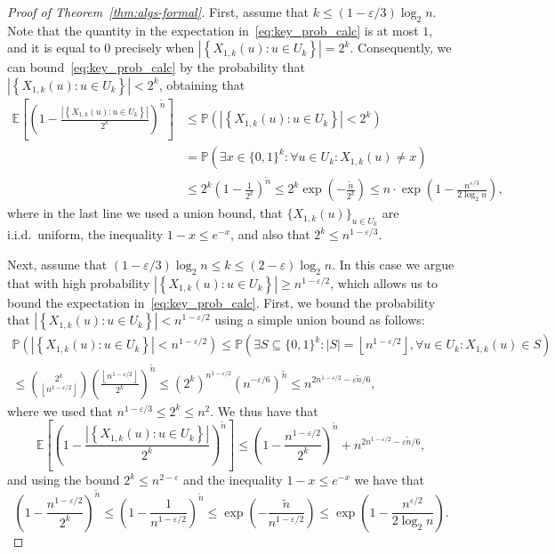 \documentclass[11pt]{article}
\theoremstyle{plain}
\theoremstyle{definition}
\theoremstyle{remark}
\newcommand{\E}{\mathbb{E}}
\newcommand{\eps}{\varepsilon}
\renewcommand{\Pr}{\mathbb{P}}
\begin{document}
\begin{proof}[Proof of Theorem~\ref{thm:algs-formal}]
First, assume that $k \leq (1-\eps/3) \log_{2} n$. 
Note that the quantity in the expectation in~\eqref{eq:key_prob_calc} is at most $1$, and it is equal to $0$ precisely when 
$\left| \left\{ X_{1,k}(u) : u \in U_{k} \right\} \right| = 2^{k}$. 
Consequently, we can bound~\eqref{eq:key_prob_calc} by the probability that 
$\left| \left\{ X_{1,k}(u) : u \in U_{k} \right\} \right| < 2^{k}$, 
obtaining that 
\begin{align*}
\E \left[ \left( 1 - \frac{\left| \left\{ X_{1,k}(u) : u \in U_{k} \right\} \right|}{2^{k}} \right)^{\widetilde{n}} \right]
&\leq 
\Pr \left( \left| \left\{ X_{1,k}(u) : u \in U_{k} \right\} \right| < 2^{k} \right) \\
&= \Pr \left( \exists x \in \{0,1\}^{k} : \forall u \in U_{k} : X_{1,k}(u) \neq x \right) \\
&\leq 2^{k} \left( 1 - \frac{1}{2^{k}} \right)^{\widetilde{n}} 
\leq 2^{k} \exp \left( - \frac{\widetilde{n}}{2^{k}} \right) 
\leq n \cdot \exp \left( 1 - \frac{n^{\eps/3}}{2 \log_2 n} \right),
\end{align*}
where in the last line we used a union bound, 
that $\{ X_{1,k}(u) \}_{u \in U_{k}}$ are i.i.d.\ uniform, 
the inequality $1-x \leq e^{-x}$, 
and also that $2^{k} \leq n^{1-\eps/3}$. 


Next, assume that 
$(1-\eps/3) \log_{2} n \leq k \leq (2-\eps) \log_{2} n$. 
In this case we argue that with high probability 
$\left| \left\{ X_{1,k}(u) : u \in U_{k} \right\} \right| \geq n^{1-\eps/2}$, 
which allows us to bound the expectation in~\eqref{eq:key_prob_calc}. 
First, we bound the probability that 
$\left| \left\{ X_{1,k}(u) : u \in U_{k} \right\} \right| < n^{1-\eps/2}$
using a simple union bound as follows: 
\begin{multline*}
\Pr \left( \left| \left\{ X_{1,k}(u) : u \in U_{k} \right\} \right| < n^{1-\eps/2} \right) 
\leq 
\Pr \left( \exists S \subseteq \{0,1\}^{k} : |S| = \left\lfloor n^{1-\eps/2} \right\rfloor, \forall u \in U_{k} : X_{1,k}(u) \in S \right) \\
\leq \binom{2^{k}}{\left\lfloor n^{1-\eps/2} \right\rfloor} \left( \frac{\left\lfloor n^{1-\eps/2} \right\rfloor}{2^{k}} \right)^{\widetilde{n}} 
\leq \left( 2^{k} \right)^{n^{1-\eps/2}} \left( n^{-\eps/6} \right)^{\widetilde{n}} 
\leq n^{2n^{1-\eps/2} - \eps \widetilde{n}/6},
\end{multline*}
where we used that 
$n^{1-\eps/3} \leq 2^{k} \leq n^{2}$. We thus have that 
\[
\E \left[ \left( 1 - \frac{\left| \left\{ X_{1,k}(u) : u \in U_{k} \right\} \right|}{2^{k}} \right)^{\widetilde{n}} \right] 
\leq 
\left( 1 - \frac{n^{1-\eps/2}}{2^{k}} \right)^{\widetilde{n}} + n^{2n^{1-\eps/2} - \eps \widetilde{n}/6},
\]
and using the bound $2^{k} \leq n^{2-\eps}$ and the inequality $1-x \leq e^{-x}$ we have that 
\[
\left( 1 - \frac{n^{1-\eps/2}}{2^{k}} \right)^{\widetilde{n}} 
\leq 
\left( 1 - \frac{1}{n^{1-\eps/2}} \right)^{\widetilde{n}} 
\leq \exp \left( - \frac{\widetilde{n}}{n^{1-\eps/2}} \right) 
\leq \exp \left( 1 - \frac{n^{\eps/2}}{2 \log_2 n} \right).
\]



\end{proof}
\end{document}
